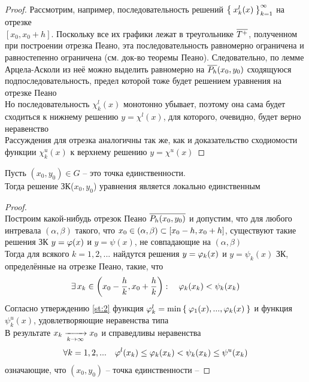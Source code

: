 \begin{proof}
    Рассмотрим, например, последовательность решений $ \Set{x_k^l(x)}_{k=1}^{\infty} $ на отрезке \\
    $ [x_0, x_0 + h] $. Поскольку все их графики лежат в треугольнике $ \overline{T^+} $, полученном при построении отрезка Пеано, эта последовательность равномерно ограничена и равностепенно ограничена (см. док-во теоремы Пеано). Следовательно, по лемме Арцела-Асколи из неё можно выделить равномерно на $ \overline{P_h}{(x_0, y_0)} $ сходящуюся подпоследовательность, предел которой тоже будет решением уравнения  на отрезке Пеано \\
    Но последовательность $ \chi_k^l(x) $ монотонно убывает, поэтому она сама будет сходиться к нижнему решению $ y = \chi^l(x) $, для которого, очевидно, будет верно неравенство  \\
    Рассуждения для отрезка аналогичны так же, как и доказательство сходиомости функции $ \chi_k^u(x) $ к верхнему решению $ y = \chi^u(x) $
\end{proof}

\begin{theorem}
	Пусть $ (x_0, y_0) \in G $ -- это точка единственности. \\
    Тогда решение ЗК($ x_0, y_0 $) уравнения  является локально единственным
\end{theorem}

\begin{proof}
     \\
    Построим какой-нибудь отрезок Пеано $ \overline{P_h(x_0, y_0)} $ и допустим, что для любого интревала $ (\alpha, \beta) $ такого, что $ x_0 \in (\alpha, \beta) \subset [x_0 - h, x_0 + h] $, существуют такие решения ЗК $ y = \varphi(x) $ и $ y = \psi(x) $, не совпадающие на $ (\alpha, \beta) $ \\
    Тогда для всякого $ k = 1, 2, ... $ найдутся решения $ y = \varphi_k(x) $ и $ y = \psi_k(x) $ ЗК, определённые на отрезке Пеано, такие, что
    $$ \exists\, x_k \in \bigg( x_0 - \frac{h}k, x_0 + \frac{h}k \bigg) : \quad \varphi_k(x_k) < \psi_k(x_k) $$
    Согласно утверждению \ref{st:2} функция $ \varphi_k^l = \min\Set{\varphi_1(x), ..., \varphi_k(x)} $ и функция $ \psi_k^u(x) $, удовлетворяющие неравенства типа  \\
    В результате $ x_k \xrightarrow[{k} \to {\infty}]{} x_0 $ и справедливы неравенства
    $$ \forall k = 1, 2, ... \quad \varphi^l(x_k) \le \varphi_k(x_k) < \psi_k(x_k) \le \psi^u(x_k) $$
    означающие, что $ (x_0, y_0) $ -- точка единственности -- \contra
\end{proof}

